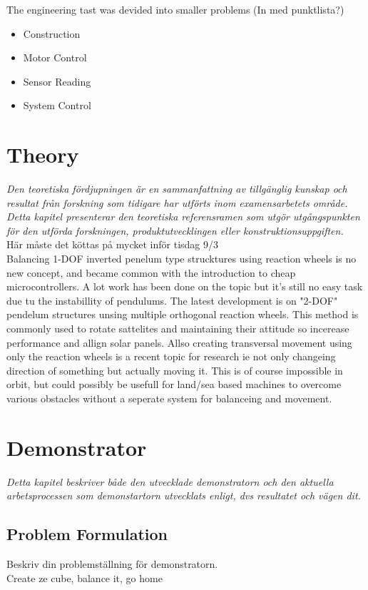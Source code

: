 \documentclass[a4paper,11pt]{kth-mag}
\begin{document}
The engineering tast was devided into smaller problems (In med punktlista?)
\begin{itemize}
\item Construction
\item Motor Control
\item Sensor Reading
\item System Control
\end{itemize}



\chapter{Theory}
\emph{Den teoretiska fördjupningen är en sammanfattning av tillgänglig kunskap och resultat från forskning som tidigare har utförts inom examensarbetets område. Detta kapitel presenterar den teoretiska referensramen som utgör utgångspunkten för den utförda forskningen, produktutvecklingen eller konstruktionsuppgiften.}
\\ Här måste det köttas på mycket inför tisdag 9/3 \\

Balancing 1-DOF inverted penelum type strucktures using reaction wheels is no new concept, and became common with the introduction to cheap microcontrollers. A lot work has been done on the topic but it's still no easy task due tu the instabillity of pendulums. The latest development is on "2-DOF" pendelum structures unsing multiple orthogonal reaction wheels. This method is commonly used to rotate sattelites and maintaining their attitude so incerease performance and allign solar panels. 
Allso creating transversal movement using only the reaction wheels is a recent topic for research ie not only changeing direction of something but actually moving it. This is of course impossible in orbit, but could possibly be usefull for land/sea based machines to overcome various obstacles without a seperate system for balanceing and movement. 
\chapter{Demonstrator}
\emph{Detta kapitel beskriver både den utvecklade demonstratorn och den aktuella arbetsprocessen som demonstartorn utvecklats enligt, dvs resultatet och vägen dit.}


\section{Problem Formulation}
Beskriv din problemställning för demonstratorn.\\
Create ze cube, balance it, go home
\end{document}
